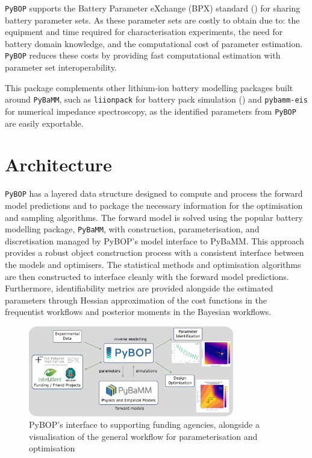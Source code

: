 \documentclass[
]{article}
\begin{document}
\texttt{PyBOP} supports the Battery Parameter eXchange (BPX) standard
() for sharing battery
parameter sets. As these parameter sets are costly to obtain due to: the
equipment and time required for characterisation experiments, the need
for battery domain knowledge, and the computational cost of parameter
estimation. \texttt{PyBOP} reduces these costs by providing fast
computational estimation with parameter set interoperability.

This package complements other lithium-ion battery modelling packages
built around \texttt{PyBaMM}, such as \texttt{liionpack} for battery
pack simulation () and
\texttt{pybamm-eis} for numerical impedance spectroscopy, as the
identified parameters from \texttt{PyBOP} are easily exportable.

\section{Architecture}\label{architecture}

\texttt{PyBOP} has a layered data structure designed to compute and
process the forward model predictions and to package the necessary
information for the optimisation and sampling algorithms. The forward
model is solved using the popular battery modelling package,
\texttt{PyBaMM}, with construction, parameterisation, and discretisation
managed by PyBOP's model interface to PyBaMM. This approach provides a
robust object construction process with a consistent interface between
the models and optimisers. The statistical methods and optimisation
algorithms are then constructed to interface cleanly with the forward
model predictions. Furthermore, identifiability metrics are provided
alongside the estimated parameters through Hessian approximation of the
cost functions in the frequentist workflows and posterior moments in the
Bayesian workflows.

\begin{figure}
\centering
\includegraphics[width=0.8\textwidth,height=\textheight]{figures/PyBOP-high-level.pdf}
\caption{PyBOP's interface to supporting funding agencies, alongside a
visualisation of the general workflow for parameterisation and
optimisation \label{fig:high-level}}
\end{figure}
\end{document}
